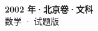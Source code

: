 \documentclass[zihao=-4, a4paper]{ctexart}
\begin{document}
\begin{center}
  {\Large\bfseries 2002 年·北京卷·文科}\\[4pt]
  {\large 数学 · 试题版}
\end{center}
\medskip
{}

\end{document}
